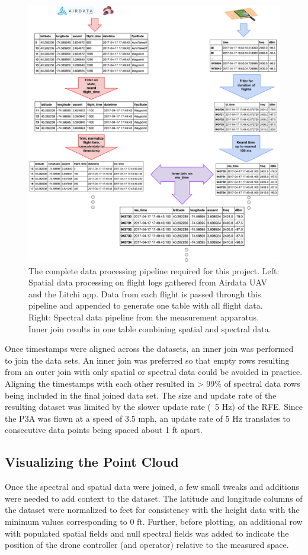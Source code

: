 \documentclass[pageno]{jpaper}
\begin{document}
\begin{figure}[!ht]
	\caption{The complete data processing pipeline required for this project. Left: Spatial data processing on flight logs gathered from Airdata UAV and the Litchi app. Data from each flight is passed through this pipeline and appended to generate one table with all flight data. Right: Spectral data pipeline from the measurement apparatus. Inner join results in one table combining spatial and spectral data.}
	\centerline{\includegraphics{data_pipeline}}
\end{figure}

Once timestamps were aligned across the datasets, an inner join was performed to join the data sets. An inner join was preferred so that empty rows resulting from an outer join with only spatial or spectral data could be avoided in practice. Aligning the timestamps with each other resulted in > 99\% of spectral data rows being included in the final joined data set. The size and update rate of the resulting dataset was limited by the slower update rate (~5 Hz) of the RFE. Since the P3A was flown at a speed of 3.5 mph, an update rate of 5 Hz translates to consecutive data points being spaced about 1 ft apart. 

\subsection{Visualizing the Point Cloud}
Once the spectral and spatial data were joined, a few small tweaks and additions were needed to add context to the dataset. The latitude and longitude columns of the dataset were normalized to feet for consistency with the height data with the minimum values corresponding to 0 ft. Further, before plotting, an additional row with populated spatial fields and null spectral fields was added to indicate the position of the drone controller (and operator) relative to the measured space. 
\end{document}
